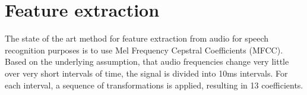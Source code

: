 \chapter{Feature extraction}

The state of the art method for feature extraction from audio for speech recognition purposes is to use Mel Frequency Cepstral Coefficients (MFCC). Based on the underlying assumption, that audio frequencies change very little over very short intervals of time, the signal is divided into 10ms intervals. For each interval, a sequence of transformations is applied, resulting in 13 coefficients.


